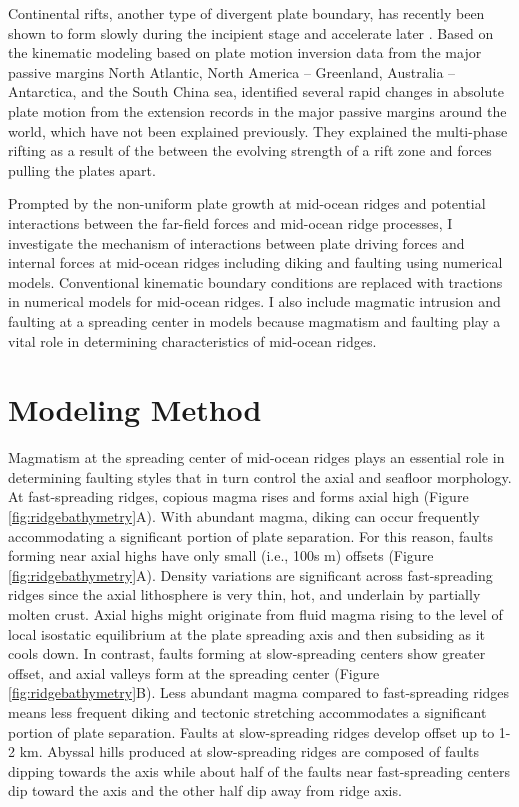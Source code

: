 \documentclass[letterpaper,12pt,notitle]{memphisthesis}                     %
\begin{document}
Continental rifts, another type of divergent plate boundary, has recently been shown to form slowly during the incipient stage and accelerate later \citep{Brune2016}. Based on the kinematic modeling based on plate motion inversion data from the major passive margins North Atlantic, North America – Greenland, Australia – Antarctica, and the South China sea, \citet{Brune2016} identified several rapid changes in absolute plate motion from the extension records in the major passive margins around the world, which have not been explained previously. They explained the multi-phase rifting as a result of the  between the evolving strength of a rift zone and forces pulling the plates apart.

Prompted by the non-uniform plate growth at mid-ocean ridges and potential interactions between the far-field forces and mid-ocean ridge processes, I investigate the mechanism of interactions between plate driving forces and internal forces at mid-ocean ridges including diking and faulting using numerical models. Conventional kinematic boundary conditions are replaced with tractions in numerical models for mid-ocean ridges. I also include magmatic intrusion and faulting at a spreading center in models because magmatism and faulting play a vital role in determining characteristics of mid-ocean ridges. 

\chapter{Modeling Method}

Magmatism at the spreading center of mid-ocean ridges plays an essential role in determining faulting styles that in turn control the axial and seafloor morphology. At fast-spreading ridges, copious magma rises and forms axial high (Figure \ref{fig:ridgebathymetry}A). With abundant magma, diking can occur frequently accommodating a significant portion of plate separation. For this reason, faults forming near axial highs have only small (i.e., 100s m) offsets (Figure \ref{fig:ridgebathymetry}A). Density variations are significant across fast-spreading ridges since the axial lithosphere is very thin, hot, and underlain by partially molten crust. Axial highs might originate from fluid magma rising to the level of local isostatic equilibrium at the plate spreading axis and then subsiding as it cools down. In contrast, faults forming at slow-spreading centers show greater offset, and axial valleys form at the spreading center (Figure \ref{fig:ridgebathymetry}B). Less abundant magma compared to fast-spreading ridges means less frequent diking and tectonic stretching accommodates a significant portion of plate separation. Faults at slow-spreading ridges develop offset up to 1-2 km. Abyssal hills produced at slow-spreading ridges are composed of faults dipping towards the axis while about half of the faults near fast-spreading centers dip toward the axis and the other half dip away from ridge axis.
\end{document}
